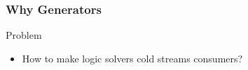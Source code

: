 \documentclass[presentation]{beamer}
\begin{document}
\begin{frame}%
    \frametitle{Why Generators}

    \begin{alertblock}{Problem}
        \begin{itemize}
            \item How to make logic solvers \alert{cold} streams consumers? 
        \end{itemize}
    \end{alertblock}

\end{frame}
\end{document}
